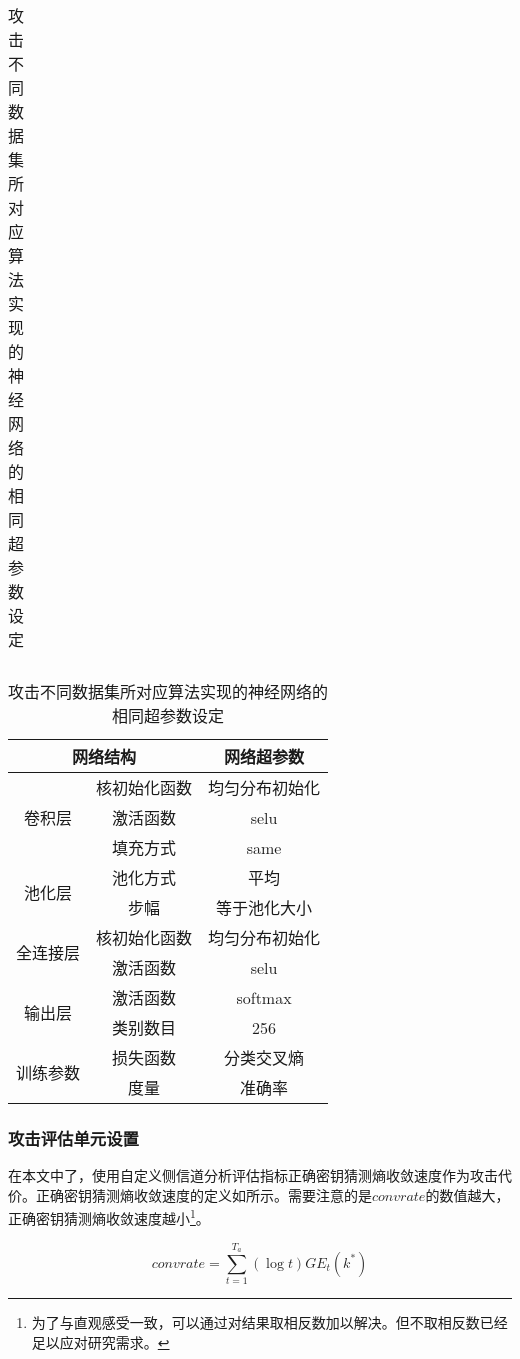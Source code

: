 {\begin{table}[!htb]
{\begin{subtable}[t]{\textwidth}
\begin{tabular}{cc|cccccc}
				\end{tabular}   
			\end{subtable}
		}
		
		\normalsize{
			\begin{subtable}[t]{\textwidth}
				\caption{攻击不同数据集所对应算法实现的神经网络的相同超参数设定}
				\centering
				\begin{tabular}{cc|c}
					\hline
					\multicolumn{2}{c|}{网络结构} &网络超参数\\
					\hline
					\multirow{3}{*}{卷积层 }     &核初始化函数    &均匀分布初始化      \\
					                             &激活函数  &selu     \\
					                             &填充方式  &same     \\
					\hline
					\multirow{2}{*}{池化层 }     &池化方式    &平均              \\
					                             &步幅  &等于池化大小     \\
					\hline
					\multirow{2}{*}{全连接层}    &核初始化函数    &均匀分布初始化          \\
					                            &激活函数  &selu     \\
					\hline
					\multirow{2}{*}{输出层}      &激活函数    &softmax          \\
					                             &类别数目    &256                  \\
					\hline
					\multirow{2}{*}{训练参数}      &损失函数    &分类交叉熵          \\
				 	                               &度量       &准确率                  \\
					\hline
				\end{tabular}
			\end{subtable}
		}
	\end{table}
	\subsubsection{攻击评估单元设置}
	在本文中了，使用自定义侧信道分析评估指标正确密钥猜测熵收敛速度作为攻击代价。正确密钥猜测熵收敛速度的定义如所示。需要注意的是$convrate$的数值越大，正确密钥猜测熵收敛速度越小\footnote{为了与直观感受一致，可以通过对结果取相反数加以解决。但不取相反数已经足以应对研究需求。}。
	
	\begin{equation}\label{eq:mycost}
	convrate=\sum\limits_{t=1}^{T_a}(\log t)GE_t(k^*)
	\end{equation}
	
}
